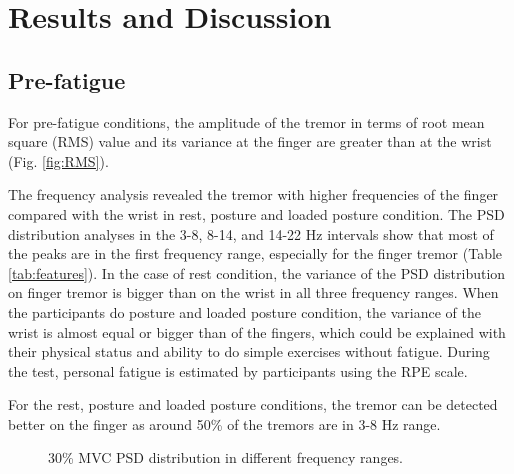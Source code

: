\documentclass[conference, a4paper]{IEEEtran}
\begin{document}
\section{Results and Discussion}
%
\subsection{Pre-fatigue}
%
For pre-fatigue conditions, the amplitude of the tremor in terms of root mean square (RMS) value and its variance at the finger are greater than at the wrist (Fig. \ref{fig:RMS}).

The frequency analysis revealed the tremor with higher frequencies of the finger compared with the wrist in rest, posture and loaded posture condition. The PSD distribution analyses in the 3-8, 8-14, and 14-22 Hz intervals show that most of the peaks are in the first frequency range, especially for the finger tremor (Table \ref{tab:features}). In the case of rest condition, the variance of the PSD distribution on finger tremor is bigger than on the wrist in all three frequency ranges. When the participants do posture and loaded posture condition, the variance of the wrist is almost equal or bigger than of the fingers, which could be explained with their physical status and ability to do simple exercises without fatigue. During the test, personal fatigue is estimated by participants using the RPE scale.

For the rest, posture and loaded posture conditions, the tremor can be detected better on the finger as around 50\% of the tremors are in 3-8 Hz range.
% 
\begin{figure}[!t]
	\centering
	\label{fig:wrist_first30MVC}
	\hfill
	\label{fig:wrist_first30MVC}
	\hfill
	\label{fig:wrist_firstMVC}
	\medskip
	\label{fig:finger_first30MVC}
	\hfill
	\label{fig:finger_first30MVC}
	\hfill
	\label{fig:finger_first30MVC}	
	\caption{30\% MVC PSD distribution in different frequency ranges.}
	\label{fig:30_MVC}
\end{figure}
% 
\end{document}
